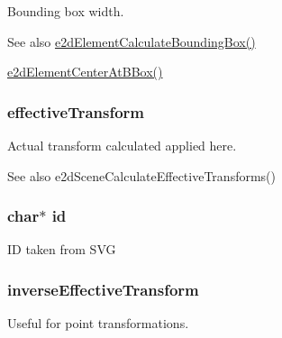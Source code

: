 Bounding box width. \begin{DoxySeeAlso}{See also}
\hyperlink{group__e2d_element_ga94aa710b2da71af2091fe4d5b87ce47e}{e2d\-Element\-Calculate\-Bounding\-Box()} 

\hyperlink{group__e2d_element_ga36b01a888c97163c990e16d348aff61c}{e2d\-Element\-Center\-At\-B\-Box()} 
\end{DoxySeeAlso}
\hypertarget{structe2d_element_a6c8e26945f09b5157e2111e42f99b879}{
\subsubsection[{effective\-Transform}]{ {\bf effective\-Transform}}}\label{structe2d_element_a6c8e26945f09b5157e2111e42f99b879}
Actual transform calculated applied here. \begin{DoxySeeAlso}{See also}
e2d\-Scene\-Calculate\-Effective\-Transforms() 
\end{DoxySeeAlso}
\hypertarget{structe2d_element_aecb3b0d045ada529257a2fbf8f829599}{
\subsubsection[{id}]{\setlength{\rightskip}{0pt plus 5cm}char$\ast$ {\bf id}}}\label{structe2d_element_aecb3b0d045ada529257a2fbf8f829599}
I\-D taken from S\-V\-G \hypertarget{structe2d_element_a5e6d7341f2dbef1923b0a3fcc13781c6}{
\subsubsection[{inverse\-Effective\-Transform}]{ {\bf inverse\-Effective\-Transform}}}\label{structe2d_element_a5e6d7341f2dbef1923b0a3fcc13781c6}
Useful for point transformations.

